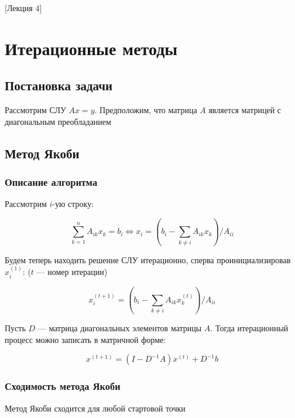 [Лекция 4]

\newpage

\section{Итерационные методы}

\subsection*{Постановка задачи}

Рассмотрим СЛУ $Ax = y$. Предположим, что матрица $A$ является матрицей с диагональным преобладанием

\subsection{Метод Якоби}\label{Jacobi method}

\subsubsection*{Описание алгоритма}

Рассмотрим $i$-ую строку:

\[
\sum\limits_{k=1}^n A_{ik} x_k = b_i \iff x_i = \left(b_i - \sum\limits_{k \neq i} A_{ik} x_k\right) / A_{ii}
\]

Будем теперь находить решение СЛУ итерационно, сперва проинициализировав $x_i^{(1)}$: ($t$ --- номер итерации)

\[
x_{i}^{(t+1)} = \left(b_i - \sum\limits_{k \neq i} A_{ik} x_k^{(t)}\right) / A_{ii}
\]

Пусть $D$ --- матрица диагональных элементов матрицы $A$. Тогда итерационный процесс можно записать в матричной форме:

\[
x^{(t+1)} = (I - D^{-1} A) x^{(t)} + D^{-1} b
\]

\subsubsection*{Сходимость метода Якоби}

\begin{claim}
    Метод Якоби сходится для любой стартовой точки
\end{claim}

